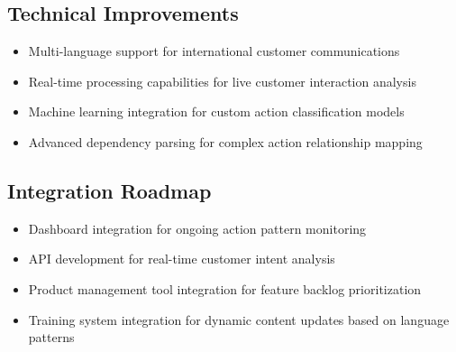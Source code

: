 \documentclass[11pt]{article}
\begin{document}
\subsection{Technical Improvements}
\begin{itemize}
\item Multi-language support for international customer communications
\item Real-time processing capabilities for live customer interaction analysis
\item Machine learning integration for custom action classification models
\item Advanced dependency parsing for complex action relationship mapping
\end{itemize}

\subsection{Integration Roadmap}
\begin{itemize}
\item Dashboard integration for ongoing action pattern monitoring
\item API development for real-time customer intent analysis
\item Product management tool integration for feature backlog prioritization
\item Training system integration for dynamic content updates based on language patterns
\end{itemize}
\end{document}
